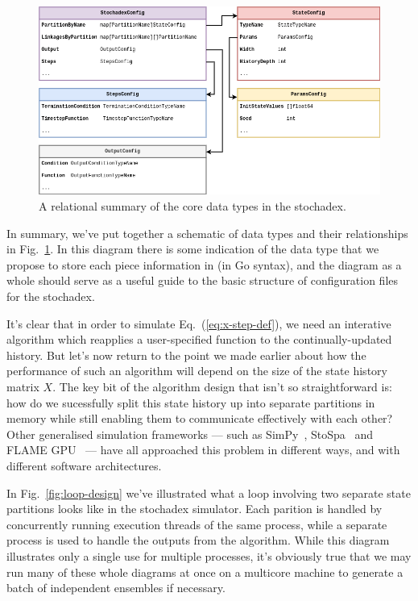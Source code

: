 \documentclass{book}
\begin{document}
\begin{figure}[h]
\centering
\includegraphics[width=15cm]{images/stochadex-data-types.drawio.png}
\caption{A relational summary of the core data types in the stochadex.}
\label{fig:data-types-design}
\end{figure}

In summary, we've put together a schematic of data types and their relationships in Fig.~\ref{fig:data-types-design}. In this diagram there is some indication of the data type that we propose to store each piece information in (in Go syntax), and the diagram as a whole should serve as a useful guide to the basic structure of configuration files for the stochadex.

It's clear that in order to simulate Eq.~(\ref{eq:x-step-def}), we need an interative algorithm which reapplies a user-specified function to the continually-updated history. But let's now return to the point we made earlier about how the performance of such an algorithm will depend on the size of the state history matrix $X$. The key bit of the algorithm design that isn't so straightforward is: how do we sucessfully split this state history up into separate partitions in memory while still enabling them to communicate effectively with each other? Other generalised simulation frameworks --- such as SimPy~\cite{simpy}, StoSpa~\cite{stospa} and FLAME GPU~\cite{flamegpu} --- have all approached this problem in different ways, and with different software architectures. 

In Fig.~\ref{fig:loop-design} we've illustrated what a loop involving two separate state partitions looks like in the stochadex simulator. Each parition is handled by concurrently running execution threads of the same process, while a separate process is used to handle the outputs from the algorithm. While this diagram illustrates only a single use for multiple processes, it's obviously true that we may run many of these whole diagrams at once on a multicore machine to generate a batch of independent ensembles if necessary.
\end{document}
